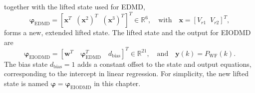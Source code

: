together with the lifted state used for EDMD,
\begin{equation}
    \bm{\varphi}_{\text{EDMD}} = [\bm{x}^T \;\; (\bm{x}^2)^T \;\; (\bm{x}^3)^T]^T \in \mathbb{R}^{6}, \quad \text{with} \quad \bm{x} = [V_{r1} \;\; V_{r2}]^T,
\end{equation}
forms a new, extended lifted state. The lifted state and the output for EIODMD are
%
\begin{equation}
    \bm{\varphi}_{\text{EIODMD}}= [\bm{w}^T \quad  \bm{\varphi}_{\text{EDMD}}^T \quad d_{\text{bias}}]^T \in \mathbb{R}^{21}, \quad \text{and} \quad \bm{y}(k) = P_{\text{WF}}(k).
\end{equation}
%
The bias state $d_{\text{bias}} = 1$ adds a constant offset to the state and output equations, corresponding to the intercept in linear regression. For simplicity, the new lifted state is named $\bm{\varphi} = \bm{\varphi}_{\text{EIODMD}}$ in this chapter.

